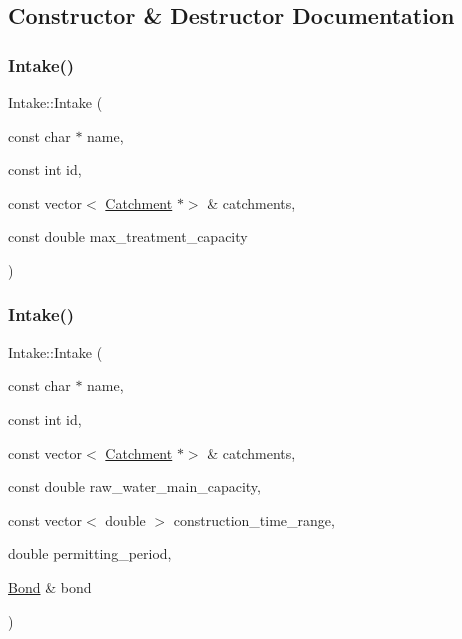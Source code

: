 \subsection{Constructor \& Destructor Documentation}
\mbox{\label{classIntake_a02e01801fcaede46e960d497e60eb335}} 
\subsubsection{\texorpdfstring{Intake()}{Intake()}\hspace{0.1cm}{\footnotesize\ttfamily [1/3]}}
{\footnotesize\ttfamily Intake\+::\+Intake (\begin{DoxyParamCaption}\item[{const char $\ast$}]{name,  }\item[{const int}]{id,  }\item[{const vector$<$ \mbox{\hyperlink{classCatchment}{Catchment}} $\ast$$>$ \&}]{catchments,  }\item[{const double}]{max\+\_\+treatment\+\_\+capacity }\end{DoxyParamCaption})}

\mbox{\label{classIntake_a41f51ae340129c31a4b2067c9f8ca0f9}} 
\subsubsection{\texorpdfstring{Intake()}{Intake()}\hspace{0.1cm}{\footnotesize\ttfamily [2/3]}}
{\footnotesize\ttfamily Intake\+::\+Intake (\begin{DoxyParamCaption}\item[{const char $\ast$}]{name,  }\item[{const int}]{id,  }\item[{const vector$<$ \mbox{\hyperlink{classCatchment}{Catchment}} $\ast$$>$ \&}]{catchments,  }\item[{const double}]{raw\+\_\+water\+\_\+main\+\_\+capacity,  }\item[{const vector$<$ double $>$}]{construction\+\_\+time\+\_\+range,  }\item[{double}]{permitting\+\_\+period,  }\item[{\mbox{\hyperlink{classBond}{Bond}} \&}]{bond }\end{DoxyParamCaption})}

